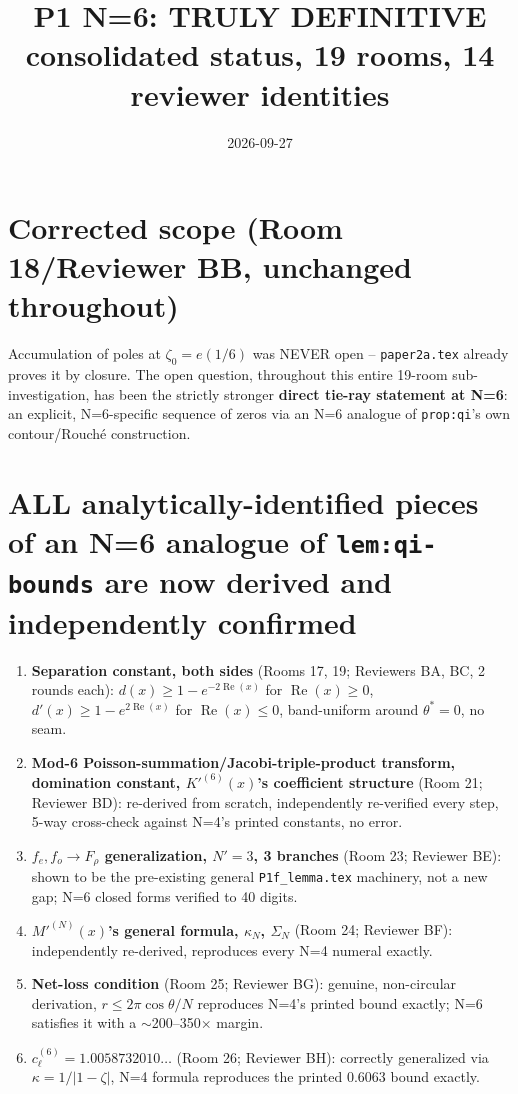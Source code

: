 \documentclass[11pt]{article}
\title{P1 N=6: TRULY DEFINITIVE consolidated status, 19 rooms, 14 reviewer identities}
\date{2026-09-27}
\begin{document}
\maketitle

\section*{Corrected scope (Room 18/Reviewer BB, unchanged throughout)}
Accumulation of poles at $\zeta_0=e(1/6)$ was NEVER open -- \texttt{paper2a.tex} already proves it
by closure. The open question, throughout this entire 19-room sub-investigation, has been the
strictly stronger \textbf{direct tie-ray statement at N=6}: an explicit, N=6-specific sequence of
zeros via an N=6 analogue of \texttt{prop:qi}'s own contour/Rouch\'e construction.

\section*{ALL analytically-identified pieces of an N=6 analogue of \texttt{lem:qi-bounds} are now
derived and independently confirmed}

\begin{enumerate}
\item \textbf{Separation constant, both sides} (Rooms 17, 19; Reviewers BA, BC, 2 rounds each):
$d(x)\ge1-e^{-2\operatorname{Re}(x)}$ for $\operatorname{Re}(x)\ge0$,
$d'(x)\ge1-e^{2\operatorname{Re}(x)}$ for $\operatorname{Re}(x)\le0$, band-uniform around
$\theta^\ast=0$, no seam.
\item \textbf{Mod-6 Poisson-summation/Jacobi-triple-product transform, domination constant,
$K'^{(6)}(x)$'s coefficient structure} (Room 21; Reviewer BD): re-derived from scratch,
independently re-verified every step, 5-way cross-check against N=4's printed constants, no error.
\item \textbf{$f_e,f_o\to F_\rho$ generalization, $N'=3$, 3 branches} (Room 23; Reviewer BE):
shown to be the pre-existing general \texttt{P1f\_lemma.tex} machinery, not a new gap; N=6 closed
forms verified to 40 digits.
\item \textbf{$M'^{(N)}(x)$'s general formula, $\kappa_N$, $\Sigma_N$} (Room 24; Reviewer BF):
independently re-derived, reproduces every N=4 numeral exactly.
\item \textbf{Net-loss condition} (Room 25; Reviewer BG): genuine, non-circular derivation,
$r\le2\pi\cos\theta/N$ reproduces N=4's printed bound exactly; N=6 satisfies it with a
$\sim$200--350$\times$ margin.
\item \textbf{$c_\ell^{(6)}=1.0058732010\ldots$} (Room 26; Reviewer BH): correctly generalized via
$\kappa=1/|1-\zeta|$, N=4 formula reproduces the printed $0.6063$ bound exactly.
\end{enumerate}
\end{document}
